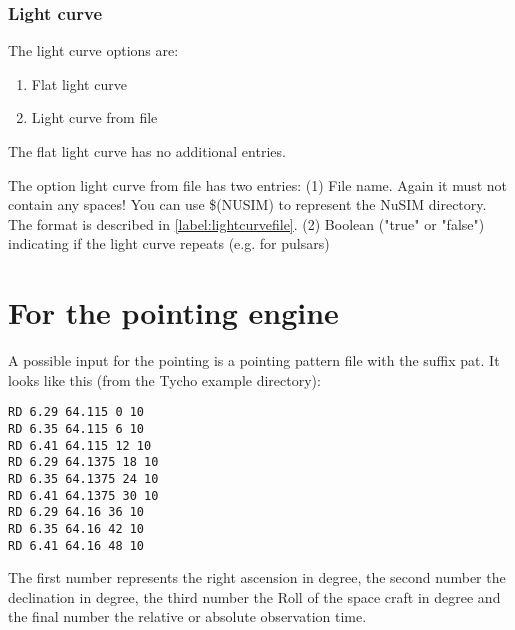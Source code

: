 \subsubsection{Light curve}

The light curve options are:
\begin{enumerate}
\item Flat light curve
\item Light curve from file
\end{enumerate}

The flat light curve has no additional entries.

The option light curve from file has two entries:
(1) File name. Again it must not contain any spaces! You can use \$(NUSIM) to represent the NuSIM directory. The format is described in \ref{label:lightcurvefile}.
(2) Boolean ("true" or "false") indicating if the light curve repeats (e.g. for pulsars)

\section{For the pointing engine \label{inputformats:pointing}}

A possible input for the pointing is a pointing pattern file with the suffix pat.
It looks like this (from the Tycho example directory):
\begin{verbatim}
RD 6.29 64.115 0 10
RD 6.35 64.115 6 10
RD 6.41 64.115 12 10
RD 6.29 64.1375 18 10
RD 6.35 64.1375 24 10
RD 6.41 64.1375 30 10
RD 6.29 64.16 36 10
RD 6.35 64.16 42 10
RD 6.41 64.16 48 10
\end{verbatim}

The first number represents the right ascension in degree, the second number the declination in degree, the third number the Roll of the space craft in degree and the final number the relative or absolute observation time.